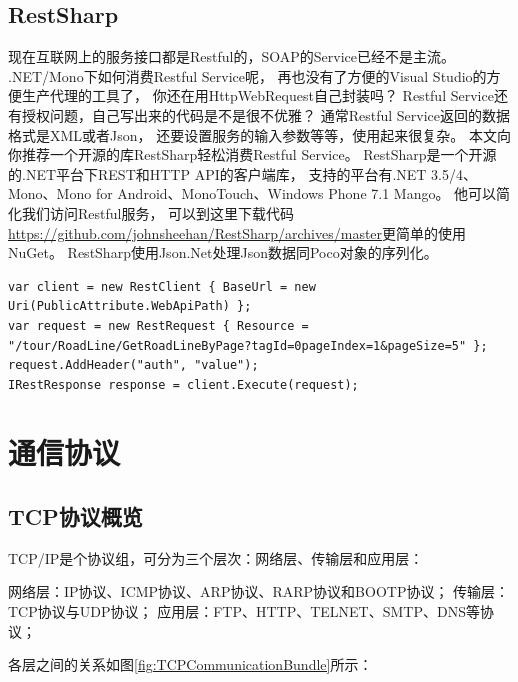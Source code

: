 \documentclass{book}
\begin{document}
\subsection{RestSharp}

现在互联网上的服务接口都是Restful的，SOAP的Service已经不是主流。
.NET/Mono下如何消费Restful Service呢，
再也没有了方便的Visual Studio的方便生产代理的工具了，
你还在用HttpWebRequest自己封装吗？
Restful Service还有授权问题，自己写出来的代码是不是很不优雅？
通常Restful Service返回的数据格式是XML或者Json，
还要设置服务的输入参数等等，使用起来很复杂。
本文向你推荐一个开源的库RestSharp轻松消费Restful Service。
RestSharp是一个开源的.NET平台下REST和HTTP API的客户端库，
支持的平台有.NET 3.5/4、Mono、Mono for Android、MonoTouch、Windows Phone 7.1 Mango。
他可以简化我们访问Restful服务，
可以到这里下载代码\url{https://github.com/johnsheehan/RestSharp/archives/master}更简单的使用NuGet。
RestSharp使用Json.Net处理Json数据同Poco对象的序列化。

\begin{lstlisting}[language={[Sharp]C}]
var client = new RestClient { BaseUrl = new Uri(PublicAttribute.WebApiPath) };
var request = new RestRequest { Resource = "/tour/RoadLine/GetRoadLineByPage?tagId=0pageIndex=1&pageSize=5" };
request.AddHeader("auth", "value");
IRestResponse response = client.Execute(request);
\end{lstlisting}

\section{通信协议}

\subsection{TCP协议概览}

TCP/IP是个协议组，可分为三个层次：网络层、传输层和应用层：

网络层：IP协议、ICMP协议、ARP协议、RARP协议和BOOTP协议；
传输层：TCP协议与UDP协议；
应用层：FTP、HTTP、TELNET、SMTP、DNS等协议；

各层之间的关系如图\ref{fig:TCPCommunicationBundle}所示：
\end{document}
